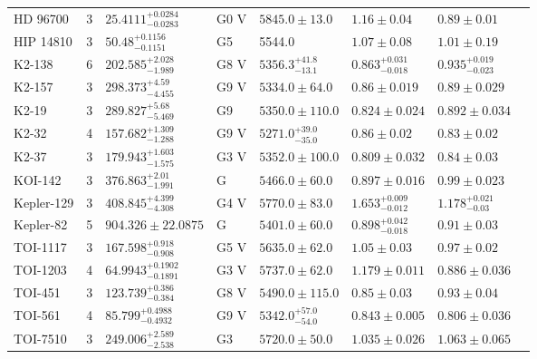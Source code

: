 \begin{tabular}{lrllllll}
HD 96700 & 3 & $25.4111^{+0.0284}_{-0.0283}$ & G0 V & $5845.0 \pm 13.0$ & $1.16 \pm 0.04$ & $0.89 \pm 0.01$ & \cite{UNGER_ET_AL__2021} \\
HIP 14810 & 3 & $50.48^{+0.1156}_{-0.1151}$ & G5 & 5544.0 & $1.07 \pm 0.08$ & $1.01 \pm 0.19$ & \cite{MENT_ET_AL__2018} \\
K2-138 & 6 & $202.585^{+2.028}_{-1.989}$ & G8 V & $5356.3^{+41.8}_{-13.1}$ & $0.863^{+0.031}_{-0.018}$ & $0.935^{+0.019}_{-0.023}$ & \cite{LOPEZ_ET_AL__2019} \\
K2-157 & 3 & $298.373^{+4.59}_{-4.455}$ & G9 V & $5334.0 \pm 64.0$ & $0.86 \pm 0.019$ & $0.89 \pm 0.029$ & \cite{CASTRO_GONZALEZ_ET_AL_2025} \\
K2-19 & 3 & $289.827^{+5.68}_{-5.469}$ & G9 & $5350.0 \pm 110.0$ & $0.824 \pm 0.024$ & $0.892 \pm 0.034$ & \cite{ALMENARA_ET_AL_2025} \\
K2-32 & 4 & $157.682^{+1.309}_{-1.288}$ & G9 V & $5271.0^{+39.0}_{-35.0}$ & $0.86 \pm 0.02$ & $0.83 \pm 0.02$ & \cite{LILLO_BOX_ET_AL__2020} \\
K2-37 & 3 & $179.943^{+1.603}_{-1.575}$ & G3 V & $5352.0 \pm 100.0$ & $0.809 \pm 0.032$ & $0.84 \pm 0.03$ & \cite{HOWARD_ET_AL__2025} \\
KOI-142 & 3 & $376.863^{+2.01}_{-1.991}$ & G & $5466.0 \pm 60.0$ & $0.897 \pm 0.016$ & $0.99 \pm 0.023$ & \cite{WEISS_ET_AL__2020} \\
Kepler-129 & 3 & $408.845^{+4.399}_{-4.308}$ & G4 V & $5770.0 \pm 83.0$ & $1.653^{+0.009}_{-0.012}$ & $1.178^{+0.021}_{-0.03}$ & \cite{ZHANG_ET_AL__2021} \\
Kepler-82 & 5 & $904.326 \pm 22.0875$ & G & $5401.0 \pm 60.0$ & $0.898^{+0.042}_{-0.018}$ & $0.91 \pm 0.03$ & \cite{FULTON__AMP__PETIGURA_2018} \\
TOI-1117 & 3 & $167.598^{+0.918}_{-0.908}$ & G5 V & $5635.0 \pm 62.0$ & $1.05 \pm 0.03$ & $0.97 \pm 0.02$ & \cite{LOCKLEY_ET_AL_2025} \\
TOI-1203 & 4 & $64.9943^{+0.1902}_{-0.1891}$ & G3 V & $5737.0 \pm 62.0$ & $1.179 \pm 0.011$ & $0.886 \pm 0.036$ & \cite{GANDOLFI_ET_AL__2025} \\
TOI-451 & 3 & $123.739^{+0.386}_{-0.384}$ & G8 V & $5490.0 \pm 115.0$ & $0.85 \pm 0.03$ & $0.93 \pm 0.04$ & \cite{BARRAGAN_ET_AL_2026} \\
TOI-561 & 4 & $85.799^{+0.4988}_{-0.4932}$ & G9 V & $5342.0^{+57.0}_{-54.0}$ & $0.843 \pm 0.005$ & $0.806 \pm 0.036$ & \cite{POLANSKI_ET_AL__2024} \\
TOI-7510 & 3 & $249.006^{+2.589}_{-2.538}$ & G3 & $5720.0 \pm 50.0$ & $1.035 \pm 0.026$ & $1.063 \pm 0.065$ & \cite{ALMENARA_ET_AL_2025} \\

\end{tabular}

